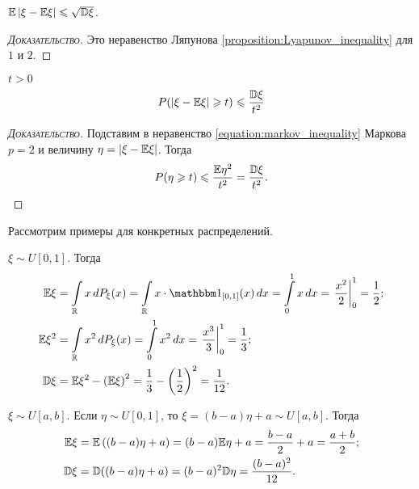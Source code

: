 \documentclass[../main.tex]{subfiles}
\begin{document}
\begin{prop}
 $ \mathbb E \left| \xi - \mathbb E\xi \right| \leqslant \sqrt{\mathbb D\xi} $.
\end{prop}
\begin{proof}[\normalfont\textsc{Доказательство}]
  Это неравенство Ляпунова \eqref{proposition:Lyapunov_inequality} для $ 1 $ и $ 2 $.
\end{proof}

\begin{prop}
 \label{proposition:chebyshev_inequality}
 $ t > 0 $
 \begin{align}
  \label{equation:chebyshev_inequality}
  P(\left| \xi - \mathbb E\xi \right| \geqslant t) \leqslant \frac{\mathbb D\xi}{t^{2}}
 \end{align} 
\end{prop}
\begin{proof}[\normalfont\textsc{Доказательство}]
 Подставим в неравенство \eqref{equation:markov_inequality} Маркова $ p=2 $ и величину $ \eta = \left| \xi - \mathbb E\xi \right| $. Тогда
 \begin{align*}
  P(\eta \geqslant t) \leqslant \frac{\mathbb E\eta^{2}}{t^{2}} = \frac{\mathbb D\xi}{t^{2}}.
 \end{align*} 
\end{proof}

Рассмотрим примеры для конкретных распределений.

\begin{exmpl}
 $ \xi \sim U[0,1] $. Тогда
 \begin{align*}
  \E\xi &= \int\limits_{\R} x\,dP_\xi(x)  = \int\limits_{\R} x \cdot \Ind_{[0,1]}  (x)\,dx= \int\limits_{0}^{1} x\,dx = \left. \frac{x^{2}}{2} \right|_0^{1} = \frac{1}{2}; \\
   \E\xi^{2} &= \int\limits_{\R} x^2\,dP_\xi(x) = \int\limits_{0}^{1} x^{2}\,dx = \left. \frac{x^{3}}{3}\right|_0^{1} = \frac{1}{3}; \\
    \D\xi &=\E\xi^{2} - \left( \E\xi \right)^{2} = \frac{1}{3} - \left(\frac{1}{2}\right)^2 = \frac{1}{12}.
 \end{align*} 
\end{exmpl}
\begin{exmpl}
 $ \xi \sim U[a,b] $. Если $ \eta \sim U[0,1] $, то $ \xi = (b-a)\eta + a\sim U[a,b] $. Тогда
 \begin{align*}
  \mathbb E\xi &= \mathbb E \left( (b-a)\eta + a \right) = (b-a)\mathbb E\eta + a = \frac{b-a}{2} + a = \frac{a+b}{2}; \\
  \mathbb D\xi &= \mathbb D((b-a)\eta + a) = (b-a)^{2}\mathbb D\eta = \frac{(b-a)^{2}}{12}.
 \end{align*} 
\end{exmpl}
\end{document}
